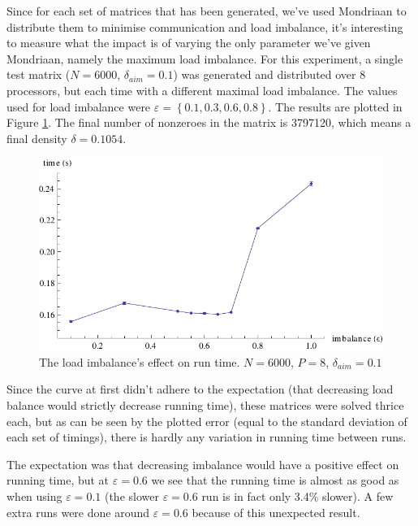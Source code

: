 \documentclass[a4paper]{article}
\begin{document}
Since for each set of matrices that has been generated, we've used Mondriaan to
distribute them to minimise communication and load imbalance, it's interesting to
measure what the impact is of varying the only parameter we've given Mondriaan, namely
the maximum load imbalance. For this experiment, a single test matrix ($N=6000$, $\delta_{aim}=0.1$) was generated and distributed
over 8 processors, but each time with a different maximal load imbalance. The
values used for load imbalance were $\varepsilon = \left\{  0.1, 0.3, 0.6, 0.8\right\}$. The results
are plotted in Figure \ref{fig:imbalance}. The final number of nonzeroes in the matrix is 3797120, which
means a final density $\delta=0.1054$.

\begin{figure}[h]
    \begin{center}
        \includegraphics[width=\plotsize]{img/imbalance.pdf}
    \end{center}
    \caption{The load imbalance's effect on run time. $N=6000$, $P=8$, $\delta_{aim}=0.1$}
    \label{fig:imbalance}
\end{figure}

Since the curve at first didn't adhere to the expectation (that decreasing load balance
would strictly decrease running time), these matrices were solved thrice each, but as can
be seen by the plotted error (equal to the standard deviation of each set of timings), there is
hardly any variation in running time between runs.

The expectation was that decreasing imbalance would have a positive effect on running time, but at
$\varepsilon=0.6$ we see that the running time is almost as good as when using $\varepsilon=0.1$ (the
slower $\varepsilon=0.6$ run is in fact only 3.4\% slower). A few extra runs were done around $\varepsilon=0.6$
because of this unexpected result.
\end{document}
